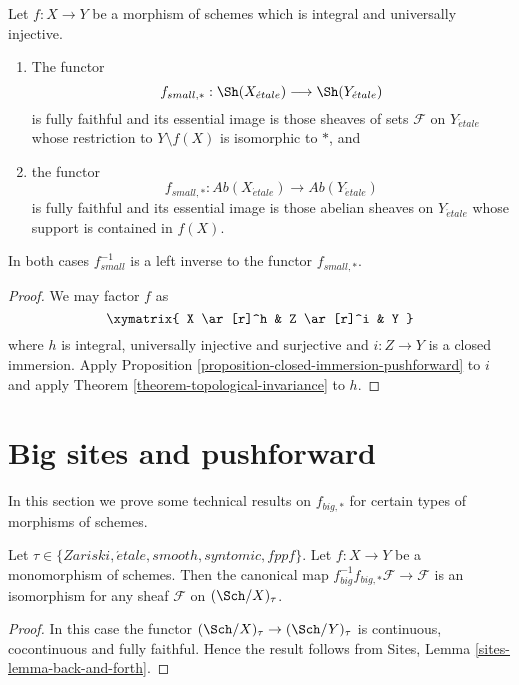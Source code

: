 \begin{proposition}
\label{proposition-integral-universally-injective-pushforward}
Let $f : X \to Y$ be a morphism of schemes which is integral
and universally injective.
\begin{enumerate}
\item The functor
$$
f_{small, *} :
\Sh(X_{\acute{e}tale})
\longrightarrow
\Sh(Y_{\acute{e}tale})
$$
is fully faithful and its essential image is those sheaves of sets
$\mathcal{F}$ on $Y_{\acute{e}tale}$ whose restriction to $Y \setminus f(X)$ is
isomorphic to $*$, and
\item the functor
$$
f_{small, *} :
\textit{Ab}(X_{\acute{e}tale})
\longrightarrow
\textit{Ab}(Y_{\acute{e}tale})
$$
is fully faithful and its essential image is those abelian sheaves on
$Y_{\acute{e}tale}$ whose support is contained in $f(X)$.
\end{enumerate}
In both cases $f_{small}^{-1}$ is a left inverse to the functor
$f_{small, *}$.
\end{proposition}

\begin{proof}
We may factor $f$ as
$$
\xymatrix{
X \ar[r]^h & Z \ar[r]^i & Y
}
$$
where $h$ is integral, universally injective and surjective
and $i : Z \to Y$ is a closed immersion.
Apply
Proposition \ref{proposition-closed-immersion-pushforward}
to $i$ and apply
Theorem \ref{theorem-topological-invariance}
to $h$.
\end{proof}









\section{Big sites and pushforward}
\label{section-big}

\noindent
In this section we prove some technical results on $f_{big, *}$ for
certain types of morphisms of schemes.

\begin{lemma}
\label{lemma-monomorphism-big-push-pull}
Let $\tau \in \{Zariski, \acute{e}tale, smooth, syntomic, fppf\}$.
Let $f : X \to Y$ be a monomorphism of schemes.
Then the canonical map
$f_{big}^{-1}f_{big, *}\mathcal{F} \to \mathcal{F}$
is an isomorphism for any sheaf $\mathcal{F}$ on
$(\Sch/X)_\tau$.
\end{lemma}

\begin{proof}
In this case the functor $(\Sch/X)_\tau \to (\Sch/Y)_\tau$
is continuous, cocontinuous and fully faithful. Hence the result follows from
Sites, Lemma \ref{sites-lemma-back-and-forth}.
\end{proof}

